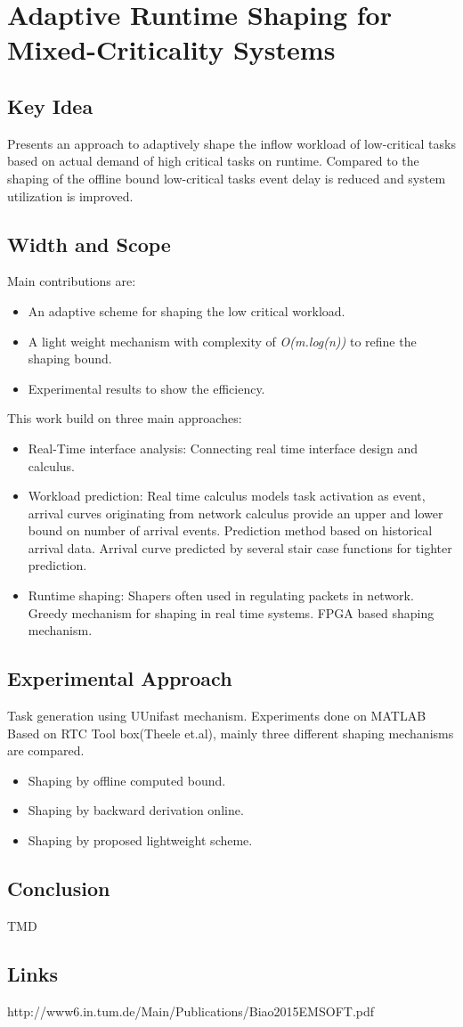 \section{Adaptive Runtime Shaping for Mixed-Criticality Systems}
\subsection*{Key Idea}
Presents an approach to adaptively shape the inflow workload of low-critical tasks based on actual demand of high critical tasks on runtime. Compared to the shaping of the offline bound low-critical tasks event delay is reduced and system utilization is improved.
\subsection{Width and Scope}
Main contributions are:
\begin{itemize}
	 \setlength{\itemsep}{0pt}
	 \setlength{\parskip}{0pt}
	 \setlength{\parsep}{0pt} 
	\item An adaptive scheme for shaping the low critical workload.
	\item A light weight mechanism with complexity of \textit{O(m.log(n))} to refine the shaping bound.
	\item Experimental results to show the efficiency.
\end{itemize}
This work build on three main approaches:
\begin{itemize}
	\item Real-Time interface analysis: Connecting real time interface design and calculus.
	\item Workload prediction: Real time calculus models task activation as event, arrival curves originating from network calculus provide an upper and lower bound on number of arrival events. Prediction method based on historical arrival data. Arrival curve predicted by several stair case functions for tighter prediction.
	\item Runtime shaping: Shapers often used in regulating packets in network. Greedy mechanism for shaping in real time systems. FPGA based shaping mechanism.
\end{itemize}

\subsection*{Experimental Approach}
Task generation using UUnifast mechanism.
Experiments done on MATLAB Based on RTC Tool box(Theele et.al), mainly three different shaping mechanisms are compared.
\begin{itemize}
	\setlength{\itemsep}{0pt}
	\setlength{\parskip}{0pt}
	\setlength{\parsep}{0pt} 
	\item Shaping by offline computed bound.
	\item Shaping by backward derivation online.
	\item Shaping by proposed lightweight scheme.
\end{itemize}
\subsection*{Conclusion}
TMD
\subsection*{Links}
http://www6.in.tum.de/Main/Publications/Biao2015EMSOFT.pdf
